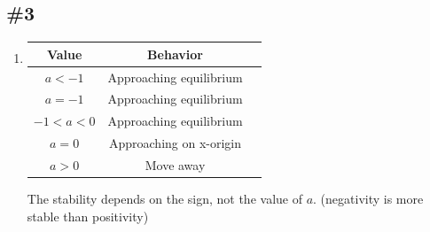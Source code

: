 \documentclass[12pt]{article}
\begin{document}
\subsection*{\#3}
\begin{enumerate}[label=\alph*.]
    \item \begin{table}[h]
        \centering
        \begin{tabular}{|c|c|c|}
          \hline
          Value & Behavior \\
          \hline
          $a < -1$ & Approaching equilibrium \\
          $a = -1$   & Approaching equilibrium \\
          $-1 < a < 0$   & Approaching equilibrium \\
            $a = 0$   & Approaching on x-origin \\
            $a > 0$   & Move away \\
          \hline
        \end{tabular}
      \end{table}
      The stability depends on the sign, not the value of $a$. (negativity is more stable than positivity)
      

\end{enumerate}
\end{document}
